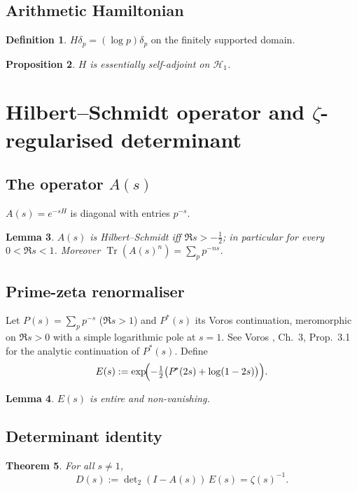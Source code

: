 \documentclass[12pt]{article}
\newtheorem{theorem}{Theorem}[section]
\newtheorem{lemma}[theorem]{Lemma}
\newtheorem{proposition}[theorem]{Proposition}
\theoremstyle{definition}
\newtheorem{definition}[theorem]{Definition}
\theoremstyle{remark}
\newcommand{\Hspace}{\mathcal H}
\newcommand{\Zeta}{\zeta}
\newcommand{\Tr}{\operatorname{Tr}}
\begin{document}
\subsection{Arithmetic Hamiltonian}
\begin{definition}
\(H\delta_{p}=(\log p)\delta_{p}\) on the finitely supported domain.
\end{definition}

\begin{proposition}
\(H\) is essentially self-adjoint on \(\Hspace_{1}\).
\end{proposition}

\section{Hilbert--Schmidt operator and $\zeta$-regularised determinant}

\subsection{The operator \(A(s)\)}
\(A(s)=e^{-sH}\) is diagonal with entries \(p^{-s}\).

\begin{lemma}
\(A(s)\) is Hilbert--Schmidt iff \(\Re s>-\tfrac12\);
in particular for every \(0<\Re s<1\).
Moreover
\(\Tr(A(s)^{n})=\sum_{p}p^{-ns}\).
\end{lemma}

\subsection{Prime-zeta renormaliser}
Let
\(P(s)=\sum_{p}p^{-s}\) (\(\Re s>1\)) and
\(P^{\!*}(s)\) its Voros continuation, meromorphic on \(\Re s>0\)
with a simple logarithmic pole at \(s=1\).
See Voros \cite{voros}, Ch.~3, Prop.~3.1 for the analytic continuation of \(P^{\!*}(s)\).
Define
\[
   E(s):=\exp\!\Bigl(-\tfrac12\bigl(P^{\!*}(2s)+\log(1-2s)\bigr)\Bigr).
\]
\begin{lemma}
\(E(s)\) is entire and non-vanishing.
\end{lemma}

\subsection{Determinant identity}

\begin{theorem}\label{thm:det}
For all \(s\ne1\),
\[
   D(s):=\det\nolimits_{2}(I-A(s))\,E(s)=\Zeta(s)^{-1}.
\]
\end{theorem}
\end{document}
